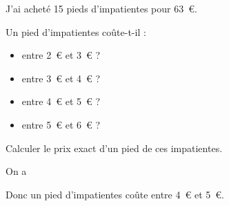 \par J'ai acheté 15 pieds d'impatientes pour 63~\textgreek{\euro}.
\begin{myenumerate}
  \item Un pied d'impatientes coûte-t-il :
\begin{itemize}
\item entre 2~\textgreek{\euro} et 3~\textgreek{\euro} ?
\item entre 3~\textgreek{\euro} et 4~\textgreek{\euro} ?
\item entre 4~\textgreek{\euro} et 5~\textgreek{\euro} ?
\item entre 5~\textgreek{\euro} et 6~\textgreek{\euro} ?
\end{itemize}
\item Calculer le prix exact d'un pied de ces impatientes.
\end{myenumerate}
\begin{myenumerate}
  \item On a 
\begin{multicols}{5}
\par
{}
\par
{}
\par
{}
\par
{}
\end{multicols}
Donc un pied d'impatientes coûte entre 4~\textgreek{\euro} et 5~\textgreek{\euro}.
\item\subitem{}\par{}
\end{myenumerate}